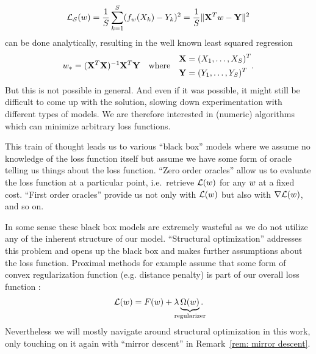 \begin{align*}
	\mathcal{L}_{\mathcal{S}}(w)
	= \frac{1}{S}\sum_{k=1}^S (f_{w}(X_k)-Y_k)^2
	= \frac{1}{S}\| \mathbf{X}^Tw - \mathbf{Y}\|^2
\end{align*}
can be done analytically, resulting in the well known least squared
regression
\begin{align*}
	w_* = (\mathbf{X}^T\mathbf{X})^{-1}\mathbf{X}^T\mathbf{Y} \quad \text{where}\quad 
	\begin{aligned}
		\mathbf{X}&=(X_1,\dots,X_S)^T\\
		\mathbf{Y}&=(Y_1,\dots,Y_S)^T
	\end{aligned}.
\end{align*}
But this is not possible in general. And even if it was possible, it might still
be difficult to come up with the solution, slowing down experimentation
with different types of models. We are therefore interested in (numeric)
algorithms which can minimize arbitrary loss functions.

This train of thought leads us to various ``black box'' models where we assume
no knowledge of the loss function itself but assume we have some form of oracle
telling us things about the loss function. ``Zero order oracles'' allow us to
evaluate the loss function at a particular point, i.e.\ retrieve \(\mathcal{L}(w)\)
for any \(w\) at a fixed cost. ``First order oracles'' provide us not
only with \(\mathcal{L}(w)\) but also with \(\nabla\mathcal{L}(w)\), and so on. 

In some sense these black box models are extremely wasteful as we do not utilize
any of the inherent structure of our model. ``Structural optimization'' addresses
this problem and opens up the black box and makes further assumptions about
the loss function. Proximal methods for example assume that some form of convex
regularization function (e.g. distance penalty) is part of our overall loss
function \parencite[e.g.][]{bottouOptimizationMethodsLargeScale2018}:
\begin{align*}
	\Loss(\weights)
	= F(\weights) + \lambda \underbrace{\Omega(\weights)}_{\mathclap{\text{regularizer}}}.
\end{align*}
Nevertheless we will mostly navigate around structural optimization in
this work, only touching on it again with ``mirror descent'' in
Remark~\ref{rem: mirror descent}.

